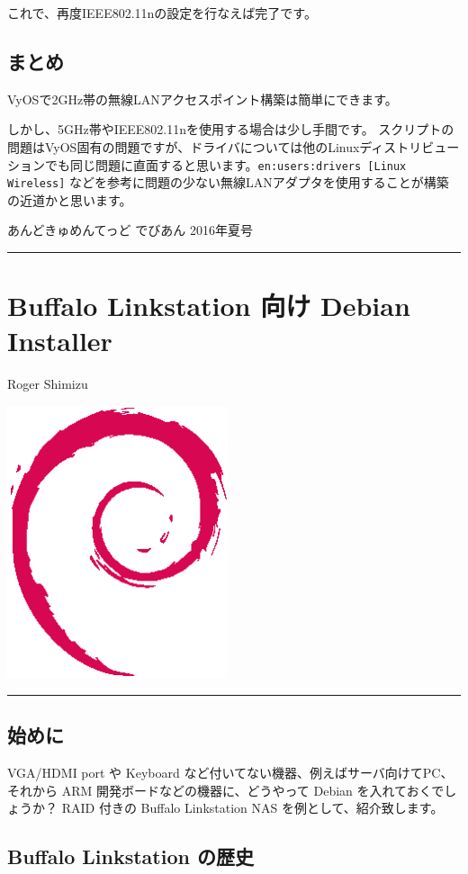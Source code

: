 \documentclass[mingoth,a4paper]{jsarticle}
\renewcommand{\dancersection}[2]{%
\newpage
あんどきゅめんてっど でびあん 2016年夏号
%
\vspace{0.1mm}\\
{\color{dancerdarkblue}\rule{\hsize}{2mm}}

%
%
\begin{minipage}[t]{0.6\hsize}
\color{dancerdarkblue}
\vspace{1cm}
\section{#1}
\hfill{}#2\\
\end{minipage}
\begin{minipage}[t]{0.4\hsize}
\vspace{-2cm}
\hfill{}\includegraphics[height=8cm]{image200502/openlogo-nd.eps}\\
\vspace{-5cm}
\end{minipage}
%
{\color{dancerlightblue}\rule{0.66\hsize}{2mm}}
%
\vspace{2cm}
}
\begin{document}
これで、再度IEEE802.11nの設定を行なえば完了です。

\subsection{まとめ}

VyOSで2GHz帯の無線LANアクセスポイント構築は簡単にできます。

しかし、5GHz帯やIEEE802.11nを使用する場合は少し手間です。
スクリプトの問題はVyOS固有の問題ですが、ドライバについては他のLinuxディストリビュー
ションでも同じ問題に直面すると思います。{\tt en:users:drivers [Linux Wireless]}
などを参考に問題の少ない無線LANアダプタを使用することが構築の近道かと思います。


\dancersection{Buffalo Linkstation 向け Debian Installer}{Roger Shimizu}

\subsection{始めに}
VGA/HDMI port や Keyboard など付いてない機器、例えばサーバ向けてPC、それから ARM 開発ボードなどの機器に、どうやって Debian を入れておくでしょうか？
RAID 付きの Buffalo Linkstation NAS を例として、紹介致します。

\subsection{Buffalo Linkstation の歴史}
\end{document}
